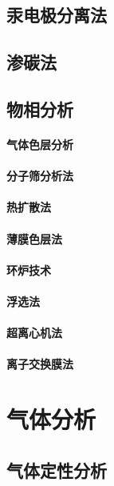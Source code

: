 \documentclass[UTF8]{../03-Chemistry}
\begin{document}
\section{汞电极分离法}
\section{渗碳法}
\section{物相分析}
    \subsubsection{气体色层分析}
    \subsubsection{分子筛分析法}
    \subsubsection{热扩散法}
    \subsubsection{薄膜色层法}
    \subsubsection{环炉技术}
    \subsubsection{浮选法}
    \subsubsection{超离心机法}
    \subsubsection{离子交换膜法}









\chapter{气体分析}
\section{气体定性分析}
\end{document}
